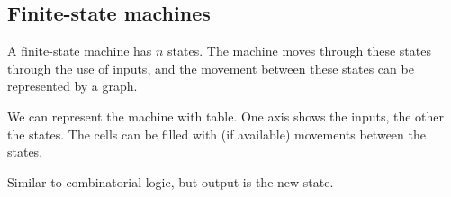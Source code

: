 
\subsection{Finite-state machines}

A finite-state machine has \(n\) states. The machine moves through these states through the use of inputs, and the movement between these states can be represented by a graph.

We can represent the machine with table. One axis shows the inputs, the other the states. The cells can be filled with (if available) movements between the states.

Similar to combinatorial logic, but output is the new state.

